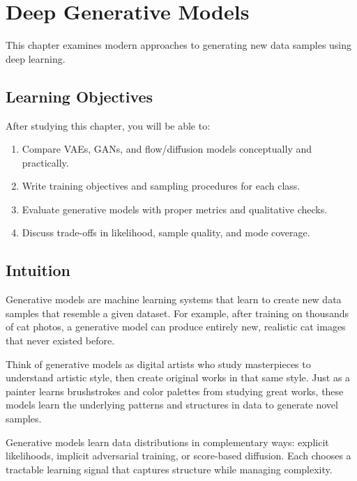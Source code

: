 
\chapter{Deep Generative Models}
\label{chap:deep-generative-models}

This chapter examines modern approaches to generating new data samples using deep learning.


\section*{Learning Objectives}

After studying this chapter, you will be able to:

\begin{enumerate}
    \item Compare VAEs, GANs, and flow/diffusion models conceptually and practically.
    \item Write training objectives and sampling procedures for each class.
    \item Evaluate generative models with proper metrics and qualitative checks.
    \item Discuss trade-offs in likelihood, sample quality, and mode coverage.
\end{enumerate}



\section*{Intuition}

Generative models are machine learning systems that learn to create new data samples that resemble a given dataset. For example, after training on thousands of cat photos, a generative model can produce entirely new, realistic cat images that never existed before.

Think of generative models as digital artists who study masterpieces to understand artistic style, then create original works in that same style. Just as a painter learns brushstrokes and color palettes from studying great works, these models learn the underlying patterns and structures in data to generate novel samples.

Generative models learn data distributions in complementary ways: explicit likelihoods, implicit adversarial training, or score-based diffusion. Each chooses a tractable learning signal that captures structure while managing complexity.












